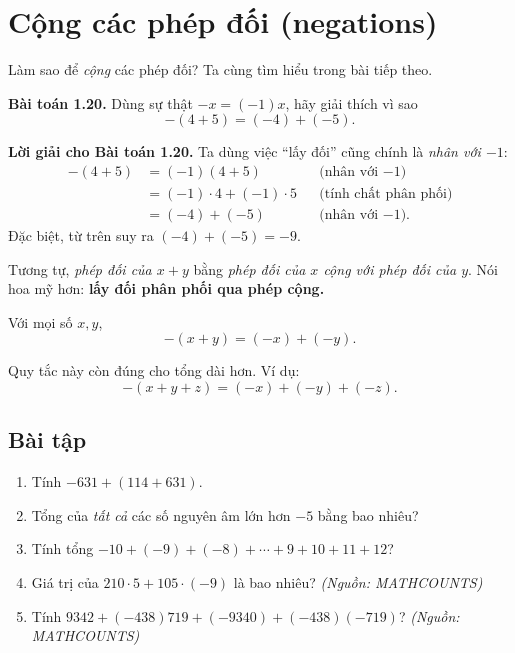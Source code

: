 

\section*{Cộng các phép đối (negations)}

Làm sao để \emph{cộng} các phép đối? Ta cùng tìm hiểu trong bài tiếp theo.

\textbf{Bài toán 1.20.} Dùng sự thật $-x = (-1)x$, hãy giải thích vì sao
\[
-(4+5)=(-4)+(-5).
\]

\textbf{Lời giải cho Bài toán 1.20.} Ta dùng việc ``lấy đối'' cũng chính là \emph{nhân với $-1$}:
\[
\begin{aligned}
-(4+5) &= (-1)(4+5) && \text{(nhân với $-1$)}\\
&= (-1)\cdot 4 + (-1)\cdot 5 && \text{(tính chất phân phối)}\\
&= (-4) + (-5) && \text{(nhân với $-1$).}
\end{aligned}
\]
Đặc biệt, từ trên suy ra $(-4)+(-5)=-9$.

Tương tự, \emph{phép đối của $x+y$} bằng \emph{phép đối của $x$ cộng với phép đối của $y$}. Nói hoa mỹ hơn: \textbf{lấy đối phân phối qua phép cộng.}

\begin{tcolorbox}[title=\textbf{Quan trọng — Đối của tổng},colback=white,
  colframe=black!20!gray,sharp corners,boxrule=0.4pt]
Với mọi số $x,y$,
\[
-(x+y)=(-x)+(-y).
\]
\end{tcolorbox}

Quy tắc này còn đúng cho tổng dài hơn. Ví dụ:
\[
-(x+y+z)=(-x)+(-y)+(-z).
\]


\subsection*{Bài tập}
\begin{enumerate}[leftmargin=*,label=\textbf{1.4.\arabic*}]
  \item Tính $-631 + (114+631)$.
  \item Tổng của \emph{tất cả} các số nguyên âm lớn hơn $-5$ bằng bao nhiêu?
  \item Tính tổng $-10 + (-9) + (-8) + \cdots + 9 + 10 + 11 + 12$?
  \item Giá trị của $210\cdot 5 + 105\cdot (-9)$ là bao nhiêu? \textit{(Nguồn: MATHCOUNTS)}
  \item Tính $9342 + (-438)719 + (-9340) + (-438)(-719)$? \textit{(Nguồn: MATHCOUNTS)}
\end{enumerate}

